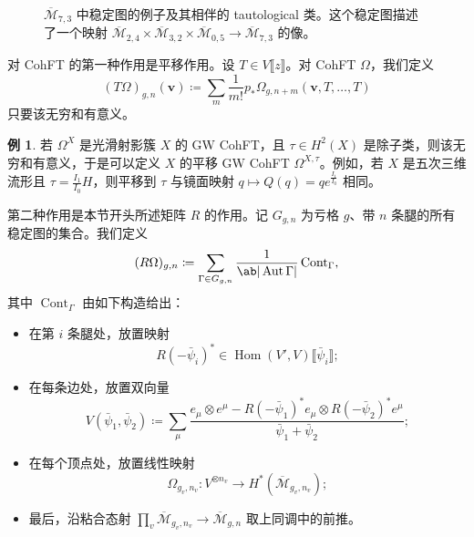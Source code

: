 \documentclass{amsart}
\theoremstyle{definition}
\newtheorem{exm}[thm]{例}
\theoremstyle{remark}
\theoremstyle{plain}
\theoremstyle{definition}
\theoremstyle{remark}
\newcommand{\Mbar}{\overline{\mathcal{M}}}
\newcommand{\mc}[1]{\mathcal{#1}}
\newcommand{\mbf}[1]{\mathbf{#1}}
\newcommand{\bv}{\mbf{v}}
\newcommand{\on}[1]{\operatorname{#1}}
\newcommand{\ol}[1]{\overline{#1}}
\newcommand{\1}{\mathbf{1}}
\newcommand{\2}{\mathbf{2}}
\newcommand{\3}{\mathbf{3}}
\newcommand{\ps}[1]{\llbracket #1 \rrbracket}
\DeclareMathOperator{\Hom}{Hom}
\DeclareMathOperator{\Aut}{Aut}
\begin{document}
\begin{figure}[htpb]
  \centering
  \caption{$\ol{\mc{M}}_{7,3}$ 中稳定图的例子及其相伴的 tautological 类。这个稳定图描述了一个映射
    $\ol{\mc{M}}_{2,4} \times \ol{\mc{M}}_{3,2} \times \ol{\mc{M}}_{0,5} \to \ol{\mc{M}}_{7,3}$ 的像。}
  \label{fig:stablegraph}
\end{figure}

对 CohFT 的第一种作用是平移作用。设 $T \in V\ps{z}$。对 CohFT $\Omega$，我们定义
\[ (T\Omega)_{g,n}(\bv) \coloneqq \sum_m \frac{1}{m!} p_* \Omega_{g,n+m}(\bv, T,\ldots,T) \]
只要该无穷和有意义。

\begin{exm}
    若 $\Omega^X$ 是光滑射影簇 $X$ 的 GW CohFT，且 $\tau \in H^2(X)$ 是除子类，则该无穷和有意义，于是可以定义 $X$ 的平移 GW CohFT $\Omega^{X,\tau}$。例如，若 $X$ 是五次三维流形且 $\tau = \frac{I_1}{I_0} H$，则平移到 $\tau$ 与镜面映射 $q \mapsto Q(q) = q e^{\frac{I_1}{I_0}}$ 相同。
\end{exm}

第二种作用是本节开头所述矩阵 $R$ 的作用。记 $G_{g,n}$ 为亏格 $g$、带 $n$ 条腿的所有稳定图的集合。我们定义
\[ (R\Omega)_{g,n} \coloneqq \sum_{\Gamma \in G_{g,n}} \frac{1}{\ab|\Aut \Gamma|} \on{Cont}_{\Gamma}, \]
其中 $\on{Cont}_{\Gamma}$ 由如下构造给出：
\begin{itemize}
    \item 在第 $i$ 条腿处，放置映射
        \[ R(-\bar{\psi}_i)^* \in \Hom(V',V) \ps{\bar{\psi}_i}; \]
    \item 在每条边处，放置双向量
        \[ V(\bar{\psi}_1, \bar{\psi}_2) \coloneqq \sum_{\mu} \frac{e_{\mu} \otimes e^{\mu} - R(-\bar{\psi}_1)^* e_{\mu} \otimes R(-\bar{\psi}_2)^* e^{\mu}}{\bar{\psi}_1 + \bar{\psi}_2}; \]
    \item 在每个顶点处，放置线性映射
        \[ \Omega_{g_v, n_v} \colon V^{\otimes n_v} \to H^*(\Mbar_{g_v, n_v}); \]
    \item 最后，沿粘合态射 $\prod_v \Mbar_{g_v, n_v} \to \Mbar_{g,n}$ 取上同调中的前推。
\end{itemize}
\end{document}
